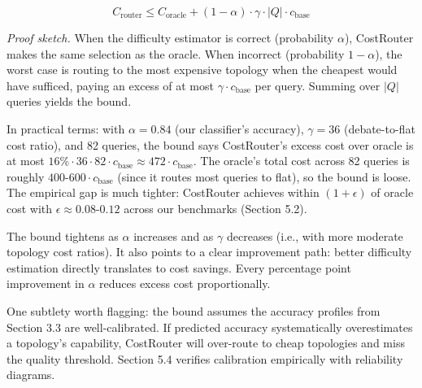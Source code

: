 $$C_{\text{router}} \leq C_{\text{oracle}} + (1 - \alpha) \cdot \gamma \cdot |Q| \cdot c_{\text{base}}$$

\emph{Proof sketch.} When the difficulty estimator is correct (probability $\alpha$), CostRouter makes the same selection as the oracle. When incorrect (probability $1 - \alpha$), the worst case is routing to the most expensive topology when the cheapest would have sufficed, paying an excess of at most $\gamma \cdot c_{\text{base}}$ per query. Summing over $|Q|$ queries yields the bound.

In practical terms: with $\alpha = 0.84$ (our classifier's accuracy), $\gamma = 36$ (debate-to-flat cost ratio), and 82 queries, the bound says CostRouter's excess cost over oracle is at most $16\% \cdot 36 \cdot 82 \cdot c_{\text{base}} \approx 472 \cdot c_{\text{base}}$. The oracle's total cost across 82 queries is roughly $400\text{-}600 \cdot c_{\text{base}}$ (since it routes most queries to flat), so the bound is loose. The empirical gap is much tighter: CostRouter achieves within $(1 + \epsilon)$ of oracle cost with $\epsilon \approx 0.08\text{-}0.12$ across our benchmarks (Section 5.2).

The bound tightens as $\alpha$ increases and as $\gamma$ decreases (i.e., with more moderate topology cost ratios). It also points to a clear improvement path: better difficulty estimation directly translates to cost savings. Every percentage point improvement in $\alpha$ reduces excess cost proportionally.

One subtlety worth flagging: the bound assumes the accuracy profiles from Section 3.3 are well-calibrated. If predicted accuracy systematically overestimates a topology's capability, CostRouter will over-route to cheap topologies and miss the quality threshold. Section 5.4 verifies calibration empirically with reliability diagrams.
